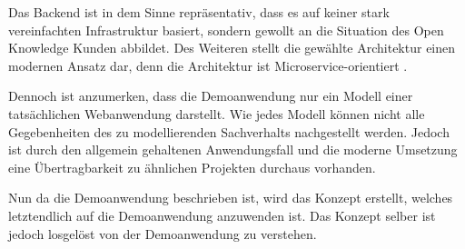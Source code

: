 Das Backend ist in dem Sinne repräsentativ, dass es auf keiner stark vereinfachten Infrastruktur basiert, sondern gewollt an die Situation des Open Knowledge Kunden abbildet. Des Weiteren stellt die gewählte Architektur einen modernen Ansatz dar, denn die Architektur ist Microservice-orientiert \cite{MicroserviceArchitecture}.

Dennoch ist anzumerken, dass die Demoanwendung nur ein Modell einer tatsächlichen Webanwendung darstellt. Wie jedes Modell können nicht alle Gegebenheiten des zu modellierenden Sachverhalts nachgestellt werden. Jedoch ist durch den allgemein gehaltenen Anwendungsfall und die moderne Umsetzung eine Übertragbarkeit zu ähnlichen Projekten durchaus vorhanden.

Nun da die Demoanwendung beschrieben ist, wird das Konzept erstellt, welches letztendlich auf die Demoanwendung anzuwenden ist. Das Konzept selber ist jedoch losgelöst von der Demoanwendung zu verstehen.